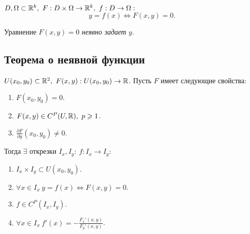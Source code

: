 \begin{definition}
    $ D,\Omega \subset \mathbb{R}^k, \ F: D \times \Omega \rightarrow \mathbb{R}^k, \ f:D \rightarrow\Omega: $
    \[
        y = f(x) \iff F(x,y) = 0.
    \]

    Уравнение $ F(x,y) = 0 $ \emph{неявно задает} $ y $.
\end{definition}

\subsection{Теорема о неявной функции}

\begin{theorem}\label{theorem:1}
    $ U(x_0,y_0) \subset \R^2, \ F(x,y):U(x_0,y_0)\rightarrow\R $. Пусть $ F $ имеет следующие свойства:
    \begin{enumerate}
        \item $ F(x_0,y_0) = 0 $.
        \item $ F(x,y) \in C^P(U,\mathbb{R}), \ p \geqslant 1 $.
        \item $ \frac{\partial F}{\partial y}(x_0,y_0)\ne 0 $.
    \end{enumerate}

    Тогда $ \exists $ открезки $ I_x,I_y: \ f:I_x \rightarrow I_y $:
    \begin{enumerate}
        \item $ I_x \times I_y \subset U(x_0,y_0) $.
        \item $ \forall x \in I_x \ y = f(x) \iff F(x,y) = 0 $.
        \item $ f \in C^P(I_x,I_y) $.
        \item $ \forall x \in I_x \ f'(x) = -\frac{F_x'(x,y)}{F_y'(x,y)} $.
    \end{enumerate}
\end{theorem}

\newpage